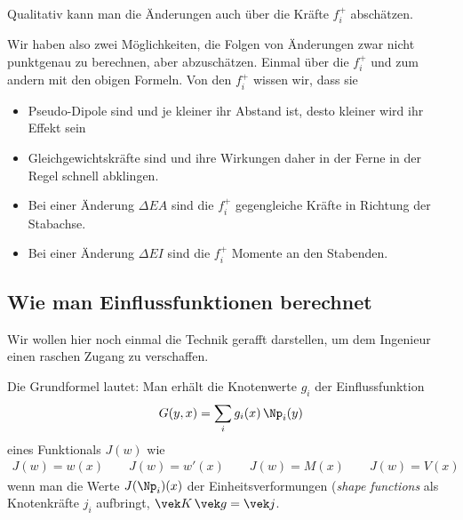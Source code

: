 {{{{{Qualitativ kann man die \"{A}nderungen auch \"{u}ber die Kr\"{a}fte $f_i^+$ absch\"{a}tzen.

Wir haben also zwei M\"{o}glichkeiten, die Folgen von \"{A}nderungen zwar nicht punktgenau zu berechnen, aber abzusch\"{a}tzen. Einmal \"{u}ber die $f_i^+$ und zum andern mit den obigen Formeln. Von den $f_i^+$ wissen wir, dass sie

\begin{itemize}
  \item Pseudo-Dipole sind und je kleiner ihr Abstand ist, desto kleiner wird ihr Effekt sein
  \item Gleichgewichtskr\"{a}fte sind und ihre Wirkungen daher in der Ferne in der Regel schnell abklingen.
  \item Bei einer \"{A}nderung $\Delta EA$ sind die $f_i^+$ gegengleiche Kr\"{a}fte in Richtung der Stabachse.
  \item Bei einer \"{A}nderung $\Delta EI$ sind die $f_i^+$ Momente an den Stabenden.
 \end{itemize}

{\textcolor{blau2}{\section{Wie man Einflussfunktionen berechnet}}
Wir wollen hier noch einmal die Technik gerafft darstellen, um dem Ingenieur einen raschen Zugang zu verschaffen.

Die Grundformel lautet: Man erh\"{a}lt die Knotenwerte $g_i$ der Einflussfunktion
\begin{align}
G(y,x) = \sum_i  g_i(x)\,\Np_i(y)
\end{align}
eines  Funktionals $J(w)$ wie
\begin{align}
J(w) = w(x) \qquad J(w) = w'(x) \qquad J(w) = M(x) \qquad J(w) = V(x)
\end{align}
wenn man die Werte $J(\Np_i)(x)$ der Einheitsverformungen ({\em shape functions\/} als Knotenkr\"{a}fte $j_i$ aufbringt, $\vek K\,\vek g = \vek j$.

}}}}}}
